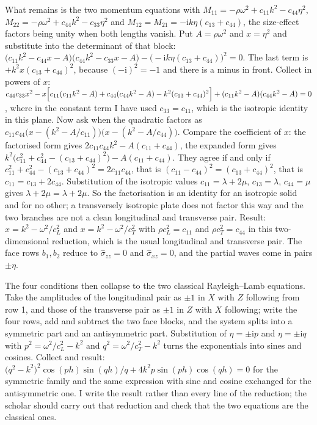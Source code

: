 \documentclass[11pt]{article}
\makeatletter
\newif\ifshowworked
\newenvironment{worked}{%
  \ifshowworked\par\smallskip\noindent\textit{Working.}\par\smallskip\else
  \setbox\z@\vbox\bgroup\fi}{\ifshowworked\par\smallskip\else\egroup\fi}
\newcommand{\ii}{\mathrm{i}}
\makeatother
\begin{document}
\begin{worked}
What remains is the two momentum equations with $M_{11}=-\rho\omega^2+c_{11}k^2-c_{44}\eta^2$,
$M_{22}=-\rho\omega^2+c_{44}k^2-c_{33}\eta^2$ and $M_{12}=M_{21}=-\ii k\eta(c_{13}+c_{44})$, the
size-effect factors being unity when both lengths vanish. Put $A=\rho\omega^2$ and $x=\eta^2$ and
substitute into the determinant of that block:
$\bigl(c_{11}k^2-c_{44}x-A\bigr)\bigl(c_{44}k^2-c_{33}x-A\bigr)-\bigl(-\ii k\eta(c_{13}+c_{44})\bigr)^2=0$.
The last term is $+k^2x(c_{13}+c_{44})^2$, because $(-\ii)^2=-1$ and there is a minus in front. Collect
in powers of $x$:
$c_{44}c_{33}x^2-x\Bigl[c_{11}(c_{11}k^2-A)+c_{44}(c_{44}k^2-A)-k^2(c_{13}+c_{44})^2\Bigr]
+(c_{11}k^2-A)(c_{44}k^2-A)=0$, where in the constant term I have used $c_{33}=c_{11}$, which is the
isotropic identity in this plane.
Now ask when the quadratic factors as $c_{11}c_{44}\bigl(x-(k^2-A/c_{11})\bigr)\bigl(x-(k^2-A/c_{44})\bigr)$.
Compare the coefficient of $x$: the factorised form gives $2c_{11}c_{44}k^2-A(c_{11}+c_{44})$, the
expanded form gives $k^2\bigl(c_{11}^2+c_{44}^2-(c_{13}+c_{44})^2\bigr)-A(c_{11}+c_{44})$. They agree if
and only if $c_{11}^2+c_{44}^2-(c_{13}+c_{44})^2=2c_{11}c_{44}$, that is
$(c_{11}-c_{44})^2=(c_{13}+c_{44})^2$, that is $c_{11}=c_{13}+2c_{44}$.
Substitution of the isotropic values $c_{11}=\lambda+2\mu$, $c_{13}=\lambda$, $c_{44}=\mu$ gives
$\lambda+2\mu=\lambda+2\mu$. So the factorisation is an identity for an isotropic solid and for no other;
a transversely isotropic plate does not factor this way and the two branches are not a clean
longitudinal and transverse pair.
Result: $x=k^2-\omega^2/c_L^2$ and $x=k^2-\omega^2/c_T^2$ with $\rho c_L^2=c_{11}$ and
$\rho c_T^2=c_{44}$ in this two-dimensional reduction, which is the usual longitudinal and transverse
pair. The face rows $b_1,b_2$ reduce to $\hat\sigma_{zz}=0$ and $\hat\sigma_{xz}=0$, and the partial waves
come in pairs $\pm\eta$.
\end{worked}

\begin{worked}
The four conditions then collapse to the two classical Rayleigh--Lamb equations. Take the amplitudes of
the longitudinal pair as $\pm1$ in $X$ with $Z$ following from row 1, and those of the transverse pair as
$\pm1$ in $Z$ with $X$ following; write the four rows, add and subtract the two face blocks, and the
system splits into a symmetric part and an antisymmetric part. Substitution of $\eta=\pm\ii p$ and
$\eta=\pm\ii q$ with $p^2=\omega^2/c_L^2-k^2$ and $q^2=\omega^2/c_T^2-k^2$ turns the exponentials into
sines and cosines. Collect and result:
$\bigl(q^2-k^2\bigr)^2\cos(ph)\sin(qh)/q+4k^2p\sin(ph)\cos(qh)=0$ for the symmetric family and the same
expression with sine and cosine exchanged for the antisymmetric one. I write the result rather than every
line of the reduction; the scholar should carry out that reduction and check that the two equations are
the classical ones.
\end{worked}
\end{document}
